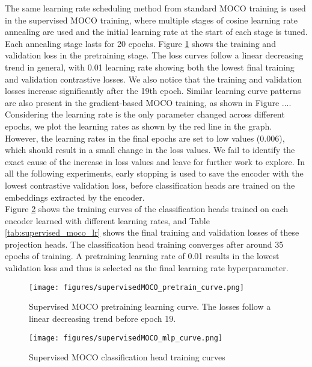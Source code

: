 \documentclass[12pt,twoside]{report}
\begin{document}
The same learning rate scheduling method from standard MOCO training is used in the supervised MOCO training, where multiple stages of cosine learning rate annealing are used and the initial learning rate at the start of each stage is tuned. Each annealing stage lasts for 20 epochs. Figure \ref{fig:supervisedMOCO_pretrain_curve} shows the training and validation loss in the pretraining stage. The loss curves follow a linear decreasing trend in general, with 0.01 learning rate showing both the lowest final training and validation contrastive losses. We also notice that the training and validation losses increase significantly after the 19th epoch. Similar learning curve patterns are also present in the gradient-based MOCO training, as shown in Figure .... Considering the learning rate is the only parameter changed across different epochs, we plot the learning rates as shown by the red line in the graph. However, the learning rates in the final epochs are set to low values (0.006), which should result in a small change in the loss values. We fail to identify the exact cause of the increase in loss values and leave for further work to explore. In all the following experiments, early stopping is used to save the encoder with the lowest contrastive validation loss, before classification heads are trained on the embeddings extracted by the encoder. \\

Figure \ref{fig:supervisedMOCO_mlp_curve} shows the training curves of the classification heads trained on each encoder learned with different learning rates, and Table \ref{tab:supervised_moco_lr} shows the final training and validation losses of these projection heads. The classification head training converges after around 35 epochs of training. A pretraining learning rate of 0.01 results in the lowest validation loss and thus is selected as the final learning rate hyperparameter.\\

\begin{figure}
    \centering
    \texttt{[image: figures/supervisedMOCO\_pretrain\_curve.png]}
    \caption{Supervised MOCO pretraining learning curve. The losses follow a linear decreasing trend before epoch 19.}
    \label{fig:supervisedMOCO_pretrain_curve}
\end{figure}

\begin{figure}
    \centering
    \texttt{[image: figures/supervisedMOCO\_mlp\_curve.png]}
    \caption{Supervised MOCO classification head training curves}
    \label{fig:supervisedMOCO_mlp_curve}
\end{figure}
\end{document}
